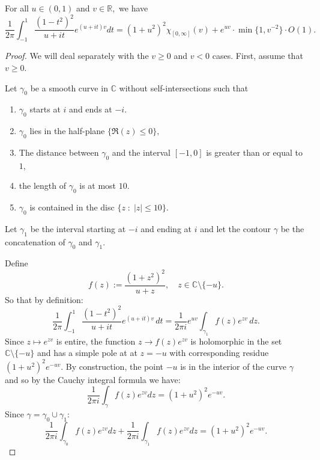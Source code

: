     \begin{prop}\label{subhankulov compute} 
        For all $u\in (0,1)$ and $v\in\mathbb{R},$ we have
        $$\frac1{2\pi}\int_{-1}^1\frac{(1-t^2)^2}{u+it}e^{(u+it)v}dt=(1+u^2)^2\chi_{[0,\infty]}(v)+e^{uv}\cdot\min\{1,v^{-2}\}\cdot O(1).$$
    \end{prop}
    \begin{proof}
        We will deal separately with the $v \geq 0$ and $v < 0$ cases. First, assume that $v \geq 0$.
    
        Let $\gamma_0$ be a smooth curve in $\mathbb{C}$ without self-intersections such that
        \begin{enumerate}
            \item $\gamma_0$ starts at $i$ and ends at $-i.$
            \item $\gamma_0$ lies in the half-plane $\{\Re(z)\leq0\},$
            \item The distance between $\gamma_0$ and the interval $[-1,0]$ is greater than or equal to $1$,
            \item the length of $\gamma_0$ is at most $10.$
            \item $\gamma_0$ is contained in the disc $\{z\;:\;|z| \leq 10\}$.
        \end{enumerate}
        Let $\gamma_1$ be the interval starting at $-i$ and ending at $i$ and let the contour $\gamma$ be the concatenation of $\gamma_0$ and $\gamma_1.$
        
        Define 
        \begin{equation*}
            f(z) := \frac{(1+z^2)^2}{u+z},\quad z\in\mathbb{C}\setminus \{-u\}.
        \end{equation*}
        So that by definition:
        \begin{equation}\label{wick rotation}
            \frac{1}{2\pi} \int_{-1}^1 \frac{(1-t^2)^2}{u+it}e^{(u+it)v}\,dt = \frac{1}{2\pi i} e^{uv}\int_{\gamma_1} f(z)e^{zv}\,dz.
        \end{equation}
        Since $z\mapsto e^{zv}$ is entire, the function $z\to f(z)e^{zv}$ is holomorphic in the set $\mathbb{C}\setminus \{-u\}$ and has a simple pole at at $z=-u$
        with corresponding residue $(1+u^2)^2e^{-uv}.$ By construction,
        the point $-u$ is in the interior of the curve $\gamma$ and so         
        by the Cauchy integral formula we have:
        \begin{equation*}
            \frac{1}{2\pi i}\int_{\gamma}f(z)e^{zv}dz = (1+u^2)^2e^{-uv}.
        \end{equation*}
        Since $\gamma = \gamma_0\cup\gamma_1$:
        \begin{equation}\label{v>0 eq1}
            \frac1{2\pi i}\int_{\gamma_0}f(z)e^{zv}dz+\frac1{2\pi i}\int_{\gamma_1}f(z)e^{zv}dz = (1+u^2)^2e^{-uv}.
        \end{equation}
        

\end{proof}

